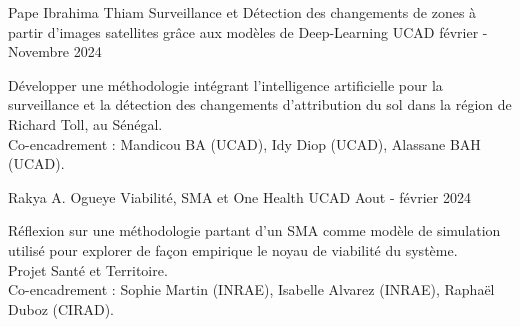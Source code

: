 \vspace{2em}
\vspace{2em}
\begin{cventries}
    \cventry
        {Pape Ibrahima Thiam} %
        {Surveillance et Détection des changements de zones à partir d’images satellites grâce aux modèles de Deep-Learning} %
        {UCAD } %
        {février - Novembre 2024} %
        {
        \begin{cvitems} %
          Développer une méthodologie intégrant l’intelligence artificielle pour la surveillance et la détection des changements d'attribution du sol dans la région de Richard Toll, au Sénégal.\\
            Co-encadrement : Mandicou BA (UCAD), Idy Diop (UCAD), Alassane BAH (UCAD).
        \end{cvitems}
        }
    \cventry
        {Rakya A. Ogueye} %
        {Viabilité, SMA et One Health} %
        {UCAD } %
        {Aout - février 2024} %
        {
        \begin{cvitems} %
            Réflexion sur une méthodologie partant d’un SMA comme modèle de simulation utilisé pour explorer de façon empirique le noyau de viabilité du système.\\
            Projet Santé et Territoire.\\
            Co-encadrement : Sophie Martin (INRAE), Isabelle Alvarez (INRAE), Raphaël Duboz (CIRAD).
        \end{cvitems}
        }


\end{cventries}
